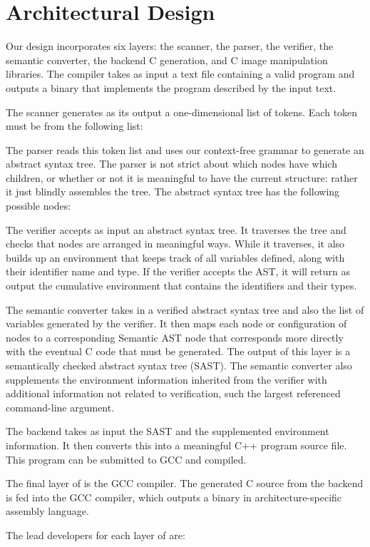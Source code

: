 \chapter{Architectural Design}



Our design incorporates six layers: the scanner, the parser, the verifier,
the semantic converter, the backend C generation, and C image manipulation
libraries. The compiler takes as input a text file containing a valid \sys{}
program and outputs a binary that implements the program described by the
input text.

The scanner generates as its output a one-dimensional list of tokens. Each
token must be from the following list:


The parser reads this token list and uses our context-free grammar to generate
an abstract syntax tree. The parser is not strict about which nodes have
which children, or whether or not it is meaningful to have the current
structure: rather it just blindly assembles the tree. The abstract syntax tree
has the following possible nodes:


The verifier accepts as input an abstract syntax tree. It traverses the
tree and checks that nodes are arranged in meaningful ways. While it
traverses, it also builds up an environment that keeps track of all
variables defined, along with their identifier name and type. If the
verifier accepts the AST, it will return as output the cumulative
environment that contains the identifiers and their types.

The semantic converter takes in a verified abstract syntax tree and also the
list of variables generated by the verifier. It then maps each node or
configuration of nodes to a corresponding Semantic AST node that
corresponds more directly with the eventual C code that must be generated.
The output of this layer is a semantically checked abstract syntax tree
(SAST). The semantic converter also supplements the environment information
inherited from the verifier with additional information not related to
verification, such the largest referenced command-line argument.


The backend takes as input the SAST and the supplemented environment
information. It then converts this into a meaningful C++ program source
file. This program can be submitted to GCC and compiled.

The final layer of \sys{} is the GCC compiler. The generated C source from
the backend is fed into the GCC compiler, which outputs a binary in
architecture-specific assembly language.

The lead developers for each layer of \sys{} are:

